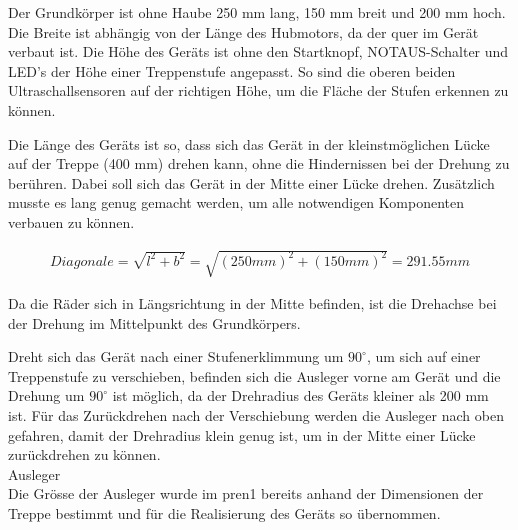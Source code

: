 Der Grundkörper ist ohne Haube 250 mm lang, 150 mm breit und 200 mm hoch. Die Breite ist abhängig von der Länge des Hubmotors, da der quer im Gerät verbaut ist. Die Höhe des Geräts ist ohne den Startknopf, NOTAUS-Schalter und LED's der Höhe einer Treppenstufe angepasst. So sind die oberen beiden Ultraschallsensoren auf der richtigen Höhe, um die Fläche der Stufen erkennen zu können.

Die Länge des Geräts ist so, dass sich das Gerät in der kleinstmöglichen Lücke auf der Treppe (400 mm) drehen kann, ohne die Hindernissen bei der Drehung zu berühren. Dabei soll sich das Gerät in der Mitte einer Lücke drehen. Zusätzlich musste es lang genug gemacht werden, um alle notwendigen Komponenten verbauen zu können.

\begin{align*}
Diagonale = \sqrt{l^{2} + b^{2}} = \sqrt{(250 mm)^{2} + (150 mm)^{2}} = 291.55 mm
\end{align*}

Da die Räder sich in Längsrichtung in der Mitte befinden, ist die Drehachse bei der Drehung im Mittelpunkt des Grundkörpers.

Dreht sich das Gerät nach einer Stufenerklimmung um $90^\circ$, um sich auf einer Treppenstufe zu verschieben, befinden sich die Ausleger vorne am Gerät und die Drehung um $90^\circ$ ist möglich, da der Drehradius des Geräts kleiner als 200 mm ist. Für das Zurückdrehen nach der Verschiebung werden die Ausleger nach oben gefahren, damit der Drehradius klein genug ist, um in der Mitte einer Lücke zurückdrehen zu können.\\

Ausleger\\

Die Grösse der Ausleger wurde im \acrshort{pren1} bereits anhand der Dimensionen der Treppe bestimmt und für die Realisierung des Geräts so übernommen.